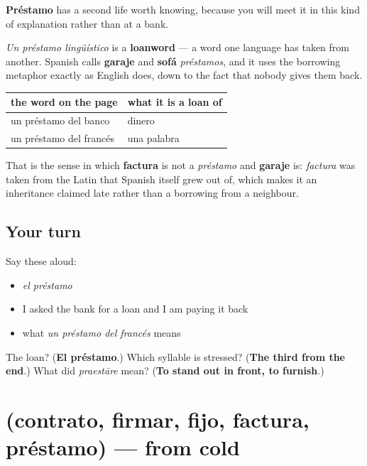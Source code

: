 \begin{culture}
\textbf{Préstamo} has a second life worth knowing, because you will meet it in this kind of explanation rather than at a bank.

\emph{Un préstamo lingüístico} is a \textbf{loanword} — a word one language has taken from another. Spanish calls \textbf{garaje} and \textbf{sofá} \emph{préstamos}, and it uses the borrowing metaphor exactly as English does, down to the fact that nobody gives them back.

\noindent
\begin{tabularx}{\linewidth}{@{}>{\raggedright\arraybackslash}X>{\raggedright\arraybackslash}X@{}}
\toprule
\textbf{the word on the page} & \textbf{what it is a loan of} \\
\midrule
un préstamo del banco & dinero \\
un préstamo del francés & una palabra \\
\bottomrule
\end{tabularx}

That is the sense in which \textbf{factura} is not a \emph{préstamo} and \textbf{garaje} is: \emph{factura} was taken from the Latin that Spanish itself grew out of, which makes it an inheritance claimed late rather than a borrowing from a neighbour.
\end{culture}

\subsection*{Your turn}
Say these aloud:

\begin{itemize}
\raggedright
  \item \emph{el préstamo}
  \item I asked the bank for a loan and I am paying it back
  \item what \emph{un préstamo del francés} means
\end{itemize}

\begin{tcolorbox}[breakable,colback=teal!4,colframe=teal!35!black,title={Before you move on}]
The loan? (\textbf{El préstamo}.) Which syllable is stressed? (\textbf{The third from the end}.) What did \emph{praestāre} mean? (\textbf{To stand out in front, to furnish}.)
\end{tcolorbox}
\section[(contrato, firmar, fijo, factura …]{(contrato, firmar, fijo, factura, préstamo) — from cold}

